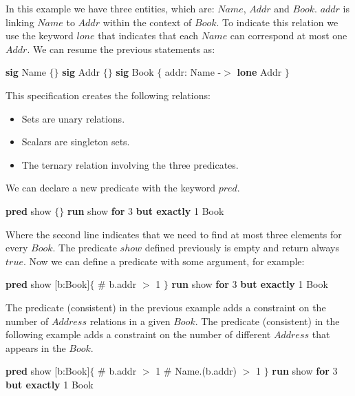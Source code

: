 \documentclass[12pt, a4paper]{report}
\newtheorem[style=M,bodystyle=\normalfont]{theorem}{Theorem}
\newtheorem[style=M,bodystyle=\normalfont]{corollary}{Corollary}
\newtheorem[style=M,bodystyle=\normalfont]{lemma}{Lemma}
\newtheorem[style=M,bodystyle=\normalfont]{definition}{Definition}
\begin{document}
    In this example we have three entities, which are: $Name$, $Addr$ and $Book$.
    $addr$ is linking $Name$ to $Addr$ within the context of $Book$. To indicate this relation we use the keyword $lone$ that indicates that each $Name$ can correspond at most one 
    $Addr$. We can resume the previous statements as:
    \begin{algorithmic}[H]
        \State \textbf{sig} Name $\{\}$
        \State \textbf{sig} Addr $\{\}$
        \State \textbf{sig} Book $\{$ 
        \State \:\:\:\:\:\: addr: Name -$>$ \textbf{lone} Addr 
        \State $\}$
    \end{algorithmic}
    This specification creates the following relations: 
    \begin{itemize}
        \item Sets are unary relations.
        \item Scalars are singleton sets.
        \item The ternary relation involving the three predicates.
    \end{itemize}
    We can declare a new predicate with the keyword $pred$. 
    \begin{algorithmic}[H]
        \State \textbf{pred} show $\{\}$
        \State \textbf{run} show \textbf{for} 3 \textbf{but exactly} 1 Book
    \end{algorithmic}
    Where the second line indicates that we need to find at most three elements for every $Book$. The predicate $show$ defined previously is empty and return always $true$. Now we 
    can define a predicate with some argument, for example: 
    \newpage
    \begin{algorithmic}[h]
        \State \textbf{pred} show [b:Book]$\{$
        \State \:\:\:\:\:\: $\#$ b.addr $>$ 1
        \State $\}$
        \State \textbf{run} show \textbf{for} 3 \textbf{but exactly} 1 Book
    \end{algorithmic} 
    The predicate (consistent) in the previous example adds a constraint on the number of $Address$ relations in a given $Book$. 
    The predicate (consistent) in the following example adds a constraint on the number of different $Address$ that appears in the $Book$.
    \begin{algorithmic}[H]
        \State \textbf{pred} show [b:Book]$\{$
        \State \:\:\:\:\:\: $\#$ b.addr $>$ 1
        \State \:\:\:\:\:\: $\#$ Name.(b.addr) $>$ 1
        \State $\}$
        \State \textbf{run} show \textbf{for} 3 \textbf{but exactly} 1 Book
    \end{algorithmic}
\end{document}
